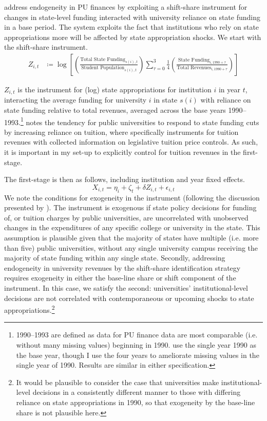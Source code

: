 \documentclass[notitlepage,12pt]{article}
\begin{document}
\cite{NBERw23736,chakrabarti2018effect,NBERw27885} address endogeneity in PU finances by exploiting a shift-share instrument for changes in state-level funding interacted with university reliance on state funding in a base period.
The system exploits the fact that institutions who rely on state appropriations more will be affected by state appropriation shocks.
We start with the shift-share instrument.
\begin{align}
    \label{eqn:public-instrument}
    Z_{i,t} &\coloneqq \log \left[
    \left( \frac{\text{Total State Funding}_{s(i),t}}{\text{Student Population}_{s(i),t}} \right)
    \sum_{\tau = 0}^{3} \frac 14
    \left( \frac{\text{State Funding}_{i,1990 + \tau}}{\text{Total Revenues}_{i,1990 + \tau}} \right) \right]
\end{align}

$Z_{i,t}$ is the instrument for (log) state appropriations for institution $i$ in year $t$, interacting the average funding for university $i$ in state $s(i)$ with reliance on state funding relative to total revenues, averaged across the base years 1990--1993.\footnote{
    1990--1993 are defined as data for PU finance data are most comparable (i.e. without many missing values) beginning in 1990.
    \cite{NBERw23736} use the single year 1990 as the base year, though I use the four years to ameliorate missing values in the single year of 1990.
    Results are similar in either specification.
}
\cite{NBERw27885} notes the tendency for public universities to respond to state funding cuts by increasing reliance on tuition, where \cite{NBERw23736} specifically instruments for tuition revenues with collected information on legislative tuition price controls.
As such, it is important in my set-up to explicitly control for tuition revenues in the first-stage.

The first-stage is then as follows, including institution and year fixed effects.
\begin{equation}
    \label{eqn:firststage}
    X_{i,t} = \eta_i + \zeta_t + \delta Z_{i,t} + \epsilon_{i,t}
\end{equation}
We note the conditions for exogeneity in the instrument (following the discussion presented by \citealt{NBERw27885}).
The instrument is exogenous if state policy decisions for funding of, or tuition charges by public universities, are uncorrelated with unobserved changes in the expenditures of any specific college or university in the state.
This assumption is plausible given that the majority of states have multiple (i.e. more than five) public universities, without any single university campus receiving the majority of state funding within any single state.
Secondly, addressing endogeneity in university revenues by the shift-share identification strategy requires exogeneity in either the base-line share or shift component of the instrument.
In this case, we satisfy the second: universities' institutional-level decisions are not correlated with contemporaneous or upcoming shocks to state appropriations.\footnote{
    It would be plausible to consider the case that universities make institutional-level decisions in a consistently different manner to those 
    with differing reliance on state appropriations in 1990, so that exogeneity by the base-line share is not plausible here.
}
\end{document}
